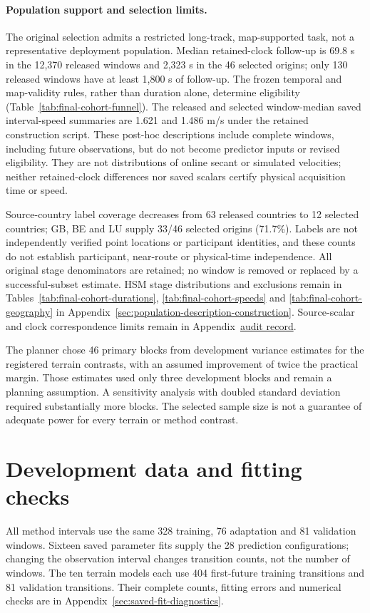 \paragraph{Population support and selection limits.}\label{sec:population-support-summary}\hypertarget{sec:population-support-summary}{}
The original selection admits a restricted long-track, map-supported task,
not a representative deployment population. Median retained-clock follow-up
is 69.8 s in the 12,370 released windows and 2,323 s in the 46 selected
origins; only 130 released windows have at least 1,800 s of follow-up.
The frozen temporal and map-validity rules, rather than duration alone,
determine eligibility (Table~\ref{tab:final-cohort-funnel}).
The released and selected window-median saved interval-speed summaries
are 1.621 and 1.486 m/s under the retained construction script. These
post-hoc descriptions include complete windows, including future
observations, but do not become predictor inputs or revised eligibility.
They are not distributions of online secant or simulated velocities;
neither retained-clock differences nor saved scalars certify physical
acquisition time or speed.

Source-country label coverage decreases from 63 released countries to
12 selected countries; GB, BE and LU supply 33/46 selected origins (71.7\%).
Labels are not independently verified point locations or participant
identities, and these counts do not establish participant, near-route or
physical-time independence. All original stage denominators are retained;
no window is removed or replaced by a successful-subset estimate.
HSM stage distributions and exclusions remain in
Tables~\ref{tab:final-cohort-durations}, \ref{tab:final-cohort-speeds} and
\ref{tab:final-cohort-geography} in
Appendix~\ref{sec:population-description-construction}. Source-scalar and
clock correspondence limits remain in
Appendix~\href{audit-notes.pdf\#sec:source-reconciliation-details}{audit record}.

The planner chose 46 primary blocks from development variance estimates for
the registered terrain contrasts, with an assumed improvement of twice the
practical margin. Those estimates used only three development blocks and
remain a planning assumption. A sensitivity analysis with doubled standard
deviation required substantially more blocks. The selected sample size is
not a guarantee of adequate power for every terrain or method contrast.


\section{Development data and fitting checks}
\label{sec:development-fit-summary}\hypertarget{sec:development-fit-summary}{}
All method intervals use the same 328 training, 76 adaptation and 81 validation
windows. Sixteen saved parameter fits supply the 28 prediction configurations;
changing the observation interval changes transition counts, not the number
of windows. The ten terrain models each use 404 first-future training
transitions and 81 validation transitions. Their complete counts, fitting
errors and numerical checks are in Appendix~\ref{sec:saved-fit-diagnostics}.


